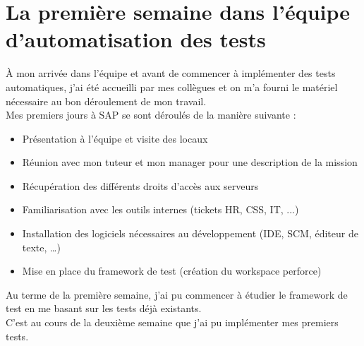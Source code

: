 \section{La premi\`{e}re semaine dans l'\'{e}quipe d'automatisation des tests}
\`{A} mon arriv\'{e}e dans l'\'{e}quipe et avant de commencer \`{a} impl\'{e}menter des tests automatiques, j'ai \'{e}t\'{e} accueilli par mes coll\`{e}gues et on m'a fourni le mat\'{e}riel n\'{e}cessaire au bon d\'{e}roulement de mon travail.\\
Mes premiers jours \`{a} SAP se sont d\'{e}roul\'{e}s de la mani\`{e}re suivante :\\
\begin{itemize}
\item Pr\'{e}sentation \`{a} l'\'{e}quipe et visite des locaux
\item R\'{e}union avec mon tuteur et mon manager pour une description de la mission
\item R\'{e}cup\'{e}ration des diff\'{e}rents droits d'acc\`{e}s aux serveurs
\item Familiarisation avec les outils internes (tickets HR, CSS, IT, ...)
\item Installation des logiciels n\'{e}cessaires au d\'{e}veloppement (IDE, SCM, \'{e}diteur de texte, \ldots)
\item Mise en place du framework de test (cr\'{e}ation du workspace perforce)
\end{itemize}
Au terme de la premi\`{e}re semaine, j'ai pu commencer \`{a} \'{e}tudier le framework de test en me basant sur les tests d\'{e}j\`{a} existants.\\
C'est au cours de la deuxi\`{e}me semaine que j'ai pu impl\'{e}menter mes premiers tests.
